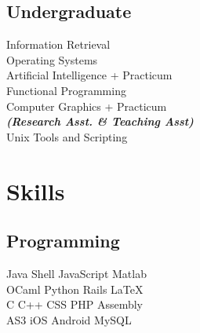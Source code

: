 \documentclass[letterpaper]{soragna-onepage-twocols} %
\begin{document}
\begin{minipage}[t]{0.33\textwidth}
\sectionspace %


\subsection{Undergraduate}

Information Retrieval \\
Operating Systems \\
Artificial Intelligence + Practicum \\
Functional Programming \\
Computer Graphics + Practicum \\
{\footnotesize \textit{\textbf{(Research Asst. \& Teaching Asst) }}} \\
Unix Tools and Scripting

\sectionspace %


\section{Skills}

\subsection{Programming}

Java \textbullet{} Shell \textbullet{} JavaScript \textbullet{} Matlab \\
OCaml \textbullet{} Python \textbullet{} Rails \textbullet{} \LaTeX\ \\ 
C \textbullet{} C++ \textbullet{} CSS \textbullet{} PHP \textbullet{} Assembly \\
AS3 \textbullet{} iOS \textbullet{} Android \textbullet{} MySQL

\sectionspace %


\end{minipage} %
\hfill
%
\end{document}
